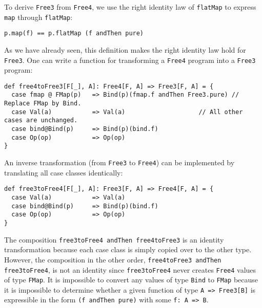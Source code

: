 To derive \lstinline!Free3!
from \lstinline!Free4!,
we use the right identity law of \lstinline!flatMap!
to express \lstinline!map!
through \lstinline!flatMap!:
\begin{lstlisting}
p.map(f) == p.flatMap (f andThen pure)
\end{lstlisting}
As we have already seen, this definition makes the right identity
law hold for \lstinline!Free3!.
One can write a function for transforming a \lstinline!Free4!
program into a \lstinline!Free3!
program:
\begin{lstlisting}
def free4toFree3[F[_], A]: Free4[F, A] => Free3[F, A] = {
  case fmap @ FMap(p)   => Bind(p)(fmap.f andThen Free3.pure) // Replace FMap by Bind.
  case Val(a)           => Val(a)                    // All other cases are unchanged.
  case bind@Bind(p)     => Bind(p)(bind.f)
  case Op(op)           => Op(op)
}
\end{lstlisting}
An inverse transformation (from \lstinline!Free3!
to \lstinline!Free4!) can
be implemented by translating all case classes identically:
\begin{lstlisting}
def free3toFree4[F[_], A]: Free3[F, A] => Free4[F, A] = {
  case Val(a)           => Val(a)
  case bind@Bind(p)     => Bind(p)(bind.f)
  case Op(op)           => Op(op)
}
\end{lstlisting}
The composition \lstinline!free3toFree4 andThen free4toFree3!
is an identity transformation because each case class is simply copied
over to the other type. However, the composition in the other order,
\lstinline!free4toFree3 andThen free3toFree4!,
is not an identity since \lstinline!free3toFree4!
never creates \lstinline!Free4!
values of type \lstinline!FMap!.
It is impossible to convert any values of type \lstinline!Bind!
to \lstinline!FMap! because
it is impossible to determine whether a given function of type \lstinline!A => Free3[B]!
is expressible in the form \lstinline!(f andThen pure)!
with some \lstinline!f: A => B!.

